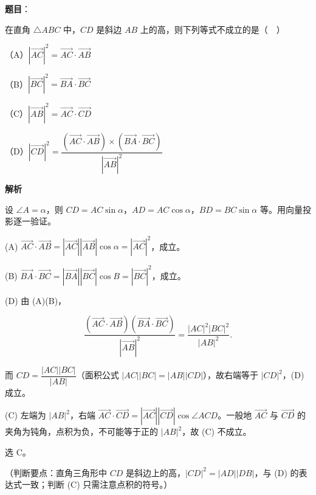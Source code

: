 \begin{answer}

\textbf{题目}：

在直角 $\triangle ABC$ 中，$CD$ 是斜边 $AB$ 上的高，则下列等式不成立的是（　）

（A）$\left|\overrightarrow{AC}\right|^2=\overrightarrow{AC}\cdot\overrightarrow{AB}$

（B）$\left|\overrightarrow{BC}\right|^2=\overrightarrow{BA}\cdot\overrightarrow{BC}$

（C）$\left|\overrightarrow{AB}\right|^2=\overrightarrow{AC}\cdot\overrightarrow{CD}$

（D）$\left|\overrightarrow{CD}\right|^2=\dfrac{\left(\overrightarrow{AC}\cdot\overrightarrow{AB}\right)\times\left(\overrightarrow{BA}\cdot\overrightarrow{BC}\right)}{\left|\overrightarrow{AB}\right|^2}$

\textbf{解析}

设 $\angle A=\alpha$，则 $CD=AC\sin\alpha$，$AD=AC\cos\alpha$，$BD=BC\sin\alpha$ 等。用向量投影逐一验证。

(A) $\overrightarrow{AC}\cdot\overrightarrow{AB}=|\overrightarrow{AC}||\overrightarrow{AB}|\cos\alpha=|\overrightarrow{AC}|^2$，成立。

(B) $\overrightarrow{BA}\cdot\overrightarrow{BC}=|\overrightarrow{BA}||\overrightarrow{BC}|\cos B=|\overrightarrow{BC}|^2$，成立。

(D) 由 (A)(B)，

\nopagebreak[4]
\[\frac{\left(\overrightarrow{AC}\cdot\overrightarrow{AB}\right)\left(\overrightarrow{BA}\cdot\overrightarrow{BC}\right)}{|\overrightarrow{AB}|^2}=\frac{|AC|^2|BC|^2}{|AB|^2}.\]

而 $CD=\dfrac{|AC||BC|}{|AB|}$（面积公式 $|AC||BC|=|AB||CD|$），故右端等于 $|CD|^2$，(D) 成立。

(C) 左端为 $|AB|^2$，右端 $\overrightarrow{AC}\cdot\overrightarrow{CD}=|\overrightarrow{AC}||\overrightarrow{CD}|\cos\angle ACD$。一般地 $\overrightarrow{AC}$ 与 $\overrightarrow{CD}$ 的夹角为钝角，点积为负，不可能等于正的 $|AB|^2$，故 (C) 不成立。

选 C。

（判断要点：直角三角形中 $CD$ 是斜边上的高，$|CD|^2=|AD||DB|$，与 (D) 的表达式一致；判断 (C) 只需注意点积的符号。）


\end{answer}
